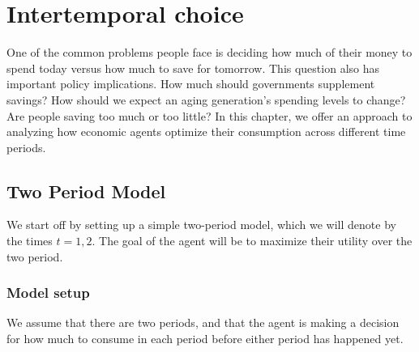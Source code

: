 \chapter{Intertemporal choice}

One of the common problems people face is deciding how much of their money to spend today versus how much to save for tomorrow. This question also has important policy implications. How much should governments supplement savings? How should we expect an aging generation's spending levels to change? Are people saving too much or too little? In this chapter, we offer an approach to analyzing how economic agents optimize their consumption across different time periods.

\section{Two Period Model}
We start off by setting up a simple two-period model, which we will denote by the times $t = 1, 2$. The goal of the agent will be to maximize their utility over the two period. 

\subsection*{Model setup}
We assume that there are two periods, and that the agent is making a decision for how much to consume in each period before either period has happened yet. 

